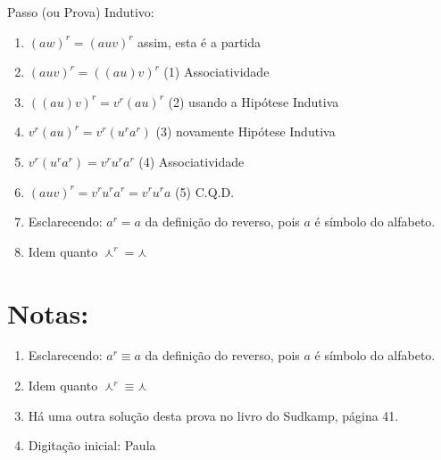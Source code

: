 \documentclass[a4paper,12pt]{article}
\begin{document}
	\vspace{1cm}	
	Passo (ou Prova)  Indutivo:
	\begin{enumerate}

		\item $(aw)^r= (auv)^r$  \hspace{2cm} assim, esta é a partida
		
		\item $(auv)^r=((au)v)^r$ \hspace{2cm} (1) Associatividade
		 
		 \item $((au)v)^r=v^r(au)^r$ \hspace{2cm}  (2) usando a Hipótese Indutiva
		 
		 \item $v^r(au)^r=v^r(u^ra^r)$ \hspace{2cm}  (3) novamente Hipótese Indutiva
		 
		 \item $v^r(u^ra^r)=v^ru^ra^r$ \hspace{2cm}  (4) Associatividade\\
		
		 
		 \item $(auv)^r=v^ru^ra^r=v^ru^ra$\hspace{2cm} 	 (5) C.Q.D.
		 
		 \item Esclarecendo: $a^r = a$ da definição do reverso, pois $a$ é símbolo do alfabeto. 
		 
		 \item Idem quanto $\curlywedge ^r = \curlywedge$

	
	
\end{enumerate}

\section{Notas:}
\begin{enumerate}

		 \item Esclarecendo: $a^r \equiv a$ da definição do reverso, pois $a$ é símbolo do alfabeto. 
		 
		 \item Idem quanto $\curlywedge ^r \equiv \curlywedge$
		 
		 \item Há uma outra solução desta prova no livro do Sudkamp, página 41.

		 \item Digitação inicial: Paula
	
	
\end{enumerate}





	
\end{document}
